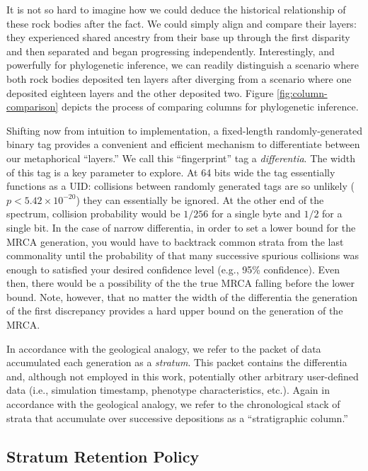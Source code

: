 It is not so hard to imagine how we could deduce the historical relationship of these rock bodies after the fact.
We could simply align and compare their layers: they experienced shared ancestry from their base up through the first disparity and then separated and began progressing independently.
Interestingly, and powerfully for phylogenetic inference, we can readily distinguish a scenario where both rock bodies deposited ten layers after diverging from a scenario where one deposited eighteen layers and the other deposited two.
Figure \ref{fig:column-comparison} depicts the process of comparing columns for phylogenetic inference.

Shifting now from intuition to implementation, a fixed-length randomly-generated binary tag provides a convenient and efficient mechanism to differentiate between our metaphorical ``layers.''
We call this ``fingerprint'' tag a \textit{differentia}.
The width of this tag is a key parameter to explore.
At 64 bits wide the tag essentially functions as a UID: collisions between randomly generated tags are so unlikely ($p < 5.42\times10^{-20}$) they can essentially be ignored.
At the other end of the spectrum, collision probability would be $1/256$ for a single byte and $1/2$ for a single bit.
In the case of narrow differentia, in order to set a lower bound for the MRCA generation, you would have to backtrack common strata from the last commonality until the probability of that many successive spurious collisions was enough to satisfied your desired confidence level (e.g., 95\% confidence).
Even then, there would be a possibility of the the true MRCA falling before the lower bound.
Note, however, that no matter the width of the differentia the generation of the first discrepancy provides a hard upper bound on the generation of the MRCA.

In accordance with the geological analogy, we refer to the packet of data accumulated each generation as a \textit{stratum}.
This packet contains the differentia and, although not employed in this work, potentially other arbitrary user-defined data (i.e., simulation timestamp, phenotype characteristics, etc.).
Again in accordance with the geological analogy, we refer to the chronological stack of strata that accumulate over successive depositions as a ``stratigraphic column.''

\subsection{Stratum Retention Policy}

